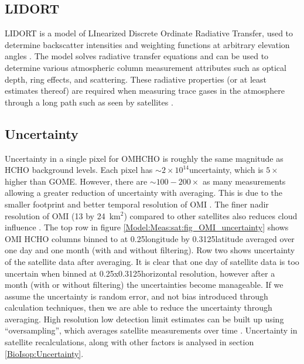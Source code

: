   \subsection{LIDORT}
    \label{Model:Meas:sat:LIDORT}
    
    LIDORT is a model of LInearized Discrete Ordinate Radiative Transfer, used to determine backscatter intensities and weighting functions at arbitrary elevation angles \parencite{Spurr2001}.
    The model solves radiative transfer equations and can be used to determine various atmospheric column measurement attributes such as optical depth, ring effects, and scattering.
    These radiative properties (or at least estimates thereof) are required when measuring trace gases in the atmosphere through a long path such as seen by satellites \parencite[e.g.,][]{Palmer2001,Martin2002a,DeSmedt2015,Abad2015}.
  
  \subsection{Uncertainty}
    Uncertainty in a single pixel for OMHCHO is roughly the same magnitude as HCHO background levels.
    Each pixel has $\sim 2 \times 10^{14}$\moleccm uncertainty, which is $5 \times$ higher than GOME.
    However, there are $\sim 100-200 \times $ as many measurements allowing a greater reduction of uncertainty with averaging.
    This is due to the smaller footprint and better temporal resolution of OMI \parencite{Chance2002,Millet2008}.
    The finer nadir resolution of OMI (13 by 24~km${^2}$) compared to other satellites also reduces cloud influence \parencite{Millet2006, Millet2008}.
    The top row in figure \ref{Model:Meas:sat:fig_OMI_uncertainty} shows OMI HCHO columns binned to at 0.25\degr longitude by 0.3125\degr latitude averaged over one day and one month (with and without filtering).
    Row two shows uncertainty of the satellite data after averaging.
    It is clear that one day of satellite data is too uncertain when binned at 0.25x0.3125\degr horizontal resolution, however after a month (with or without filtering) the uncertainties become manageable.
    If we assume the uncertainty is random error, and not bias introduced through calculation techniques, then we are able to reduce the uncertainty through averaging.
    High resolution low detection limit estimates can be built up using ``oversampling'', which averages satellite measurements over time \parencite[e.g.,][]{Zhu2014}.
    Uncertainty in satellite recalculations, along with other factors is analysed in section \ref{BioIsop:Uncertainty}.
    
